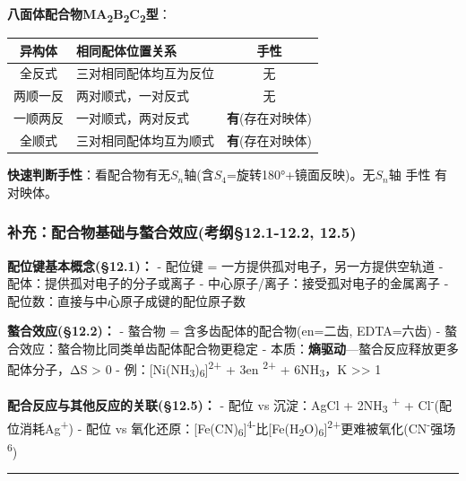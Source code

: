 \textbf{八面体配合物MA\textsubscript{2}B\textsubscript{2}C\textsubscript{2}型}：

{\def\LTcaptype{none} %
\begin{longtable}[]{@{}clc@{}}
\toprule\noalign{}
异构体 & 相同配体位置关系 & 手性 \\
\midrule\noalign{}
\endhead
\bottomrule\noalign{}
\endlastfoot
全反式 & 三对相同配体均互为反位 & 无 \\
两顺一反 & 两对顺式，一对反式 & 无 \\
一顺两反 & 一对顺式，两对反式 & \textbf{有}(存在对映体) \\
全顺式 & 三对相同配体均互为顺式 & \textbf{有}(存在对映体) \\
\end{longtable}
}

\textbf{快速判断手性}：看配合物有无\(S_n\)轴(含\(S_4\)=旋转180°+镜面反映)。无\(S_n\)轴 \箭 手性 \箭 有对映体。

\subsubsection{补充：配合物基础与螯合效应(考纲§12.1-12.2, 12.5)}\label{ux8865ux5145ux914dux5408ux7269ux57faux7840ux4e0eux87afux5408ux6548ux5e94ux8003ux7eb212.1-12.2-12.5}

\textbf{配位键基本概念(§12.1)：}
- 配位键 = 一方提供孤对电子，另一方提供空轨道
- 配体：提供孤对电子的分子或离子
- 中心原子/离子：接受孤对电子的金属离子
- 配位数：直接与中心原子成键的配位原子数

\textbf{螯合效应(§12.2)：}
- 螯合物 = 含多齿配体的配合物(en=二齿, EDTA=六齿)
- 螯合效应：螯合物比同类单齿配体配合物更稳定
- 本质：\textbf{熵驱动}---螯合反应释放更多配体分子，ΔS \textgreater{} 0
- 例：{[}Ni(NH\textsubscript{3})\textsubscript{6}{]}\textsuperscript{2+} + 3en \箭 [Ni(en)~3~]\textsuperscript{2+} + 6NH\textsubscript{3}，K \textgreater\textgreater{} 1

\textbf{配合反应与其他反应的关联(§12.5)：}
- 配位 vs 沉淀：AgCl + 2NH\textsubscript{3} \箭 [Ag(NH~3~)~2~]\textsuperscript{+} + Cl\textsuperscript{-}(配位消耗Ag\textsuperscript{+})
- 配位 vs 氧化还原：{[}Fe(CN)\textsubscript{6}{]}\textsuperscript{4-}比{[}Fe(H\textsubscript{2}O)\textsubscript{6}{]}\textsuperscript{2+}更难被氧化(CN\textsuperscript{-}强场\textsuperscript{6})

\begin{center}\rule{0.5\linewidth}{0.5pt}\end{center}

